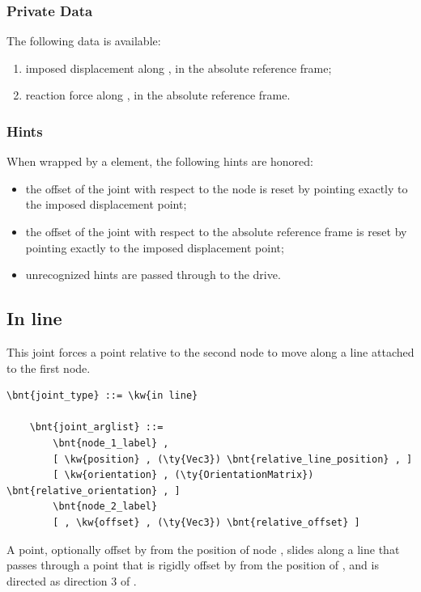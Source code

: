 \subsubsection{Private Data}
The following data is available:
\begin{enumerate}
\item {} imposed displacement along ,
in the absolute reference frame;
\item {} reaction force along ,
in the absolute reference frame.
\end{enumerate}

\subsubsection{Hints}
When wrapped by a  element, the following hints are honored:
\begin{itemize}
\item {} the offset of the joint
with respect to the node is reset by pointing exactly
to the imposed displacement point;
\item {} the offset of the joint
with respect to the absolute reference frame is reset by pointing exactly
to the imposed displacement point;
\item unrecognized hints are passed through to the drive.
\end{itemize}




\subsection{In line}
This joint forces a point relative to the second node to move 
along a line attached to the first node.
\begin{Verbatim}[commandchars=\\\{\}]
    \bnt{joint_type} ::= \kw{in line}

    \bnt{joint_arglist} ::= 
        \bnt{node_1_label} , 
        [ \kw{position} , (\ty{Vec3}) \bnt{relative_line_position} , ]
        [ \kw{orientation} , (\ty{OrientationMatrix}) \bnt{relative_orientation} , ]
        \bnt{node_2_label}
        [ , \kw{offset} , (\ty{Vec3}) \bnt{relative_offset} ]
\end{Verbatim}
A point, optionally offset by  from the position
of node , slides along a line that passes through a point 
that is rigidly offset by 
from the position of , and is directed as direction 3 
of .




